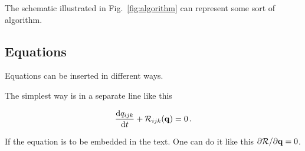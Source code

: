 The schematic illustrated in Fig.~\ref{fig:algorithm} can represent some sort of algorithm.
\iffalse
\begin{figure}[!htb]
  \centering
  \scriptsize
  \setlength{\unitlength}{0.9cm}
  \begin{picture}(8.5,6)
    \linethickness{0.3mm}

    \put(3,6){\vector(0,-1){1}}
    \put(3.5,5.4){$\bf \alpha$}
    \put(3,4.5){\oval(6,1){}}
    \put(0.3,4.4){Grid Generation: \quad ${\bf x} = {\bf x}\left({\bf \alpha}\right)$}

    \put(3,4){\vector(0,-1){1}}
    \put(3.5,3.4){$\bf x$}
    \put(3,2.5){\oval(6,1){}}
    \put(0.3,2.4){Flow Solver: \quad ${\cal R}\left({\bf x},{\bf q}\left({\bf x}\right)\right) = 0$}

    \put(6.0,2.5){\vector(1,0){1}}
    \put(6.4,3){$Y_1$}

    \put(3,2){\vector(0,-1){1}}
    \put(3.5,1.4){$\bf q$}
    \put(3,0.5){\oval(6,1){}}
    \put(0.3,0.4){Structural Solver: \quad ${\cal M}\left({\bf x},{\bf q}\left({\bf x}\right)\right) = 0$}

    \put(6.0,0.5){\vector(1,0){1}}
    \put(6.4,1){$Y_2$}

    \put(7.0,0){\framebox(1.6,5){}}
    \put(7.1,2.5){Optimizer}
    \put(7.8,5){\line(0,1){1}}
    \put(7.8,6){\line(-1,0){4.8}}
  \end{picture}
  \caption{Schematic of some algorithm.}
  \label{fig:algorithm}
\end{figure}
\fi

\subsection{Equations}
\label{subsection:equations}

Equations can be inserted in different ways.

The simplest way is in a separate line like this

\begin{equation}
  \frac{{\rm d} q_{ijk}}{{\rm d} t} + {\cal R}_{ijk}({\bf q}) = 0 \,.
\label{eq:ode}
\end{equation}

If the equation is to be embedded in the text. One can do it like this ${\partial {\cal R}}/{\partial {\bf q}}=0$.

